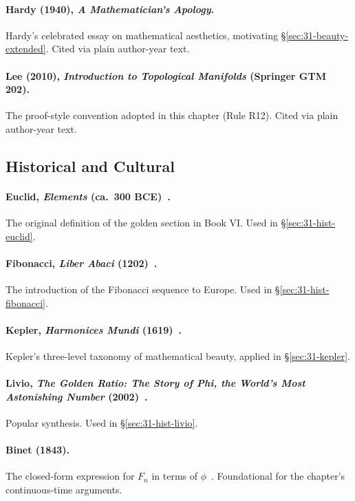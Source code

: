 \paragraph{Hardy (1940), \emph{A Mathematician's Apology}.} Hardy's celebrated essay on mathematical aesthetics, motivating §\ref{sec:31-beauty-extended}. Cited via plain author-year text.

\paragraph{Lee (2010), \emph{Introduction to Topological Manifolds} (Springer GTM 202).} The proof-style convention adopted in this chapter (Rule R12). Cited via plain author-year text.

\subsection{Historical and Cultural}
\label{sec:31-refs-historical}

\paragraph{Euclid, \emph{Elements} (ca.\ 300 BCE)~\cite{euclid_elements}.} The original definition of the golden section in Book VI. Used in §\ref{sec:31-hist-euclid}.

\paragraph{Fibonacci, \emph{Liber Abaci} (1202)~\cite{fibonacci_liber_abaci}.} The introduction of the Fibonacci sequence to Europe. Used in §\ref{sec:31-hist-fibonacci}.

\paragraph{Kepler, \emph{Harmonices Mundi} (1619)~\cite{kepler_harmonices}.} Kepler's three-level taxonomy of mathematical beauty, applied in §\ref{sec:31-kepler}.

\paragraph{Livio, \emph{The Golden Ratio: The Story of Phi, the World's Most Astonishing Number} (2002)~\cite{livio_fibonacci_numbers}.} Popular synthesis. Used in §\ref{sec:31-hist-livio}.

\paragraph{Binet (1843).} The closed-form expression for $F_{n}$ in terms of $\phi$~\cite{binet_formula}. Foundational for the chapter's continuous-time arguments.

